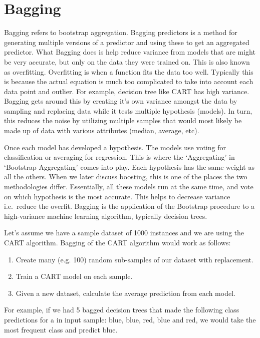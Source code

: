 \documentclass{book}
\begin{document}
\section{Bagging}
Bagging refers to bootstrap aggregation. Bagging predictors is a method for generating multiple versions of a predictor and using these to get an aggregated predictor.
What Bagging does is help reduce variance from models that are might be very accurate, but only on the data they were trained on. This is also known as overfitting. Overfitting is when a function fits the data too well. Typically this is because the actual equation is much too complicated to take into account each data point and outlier. For example, decision tree like CART has high variance.
Bagging gets around this by creating it's own variance amongst the data by sampling and replacing data while it tests multiple hypothesis (models). In turn, this reduces the noise by utilizing multiple samples that would most likely be made up of data with various attributes (median, average, etc).

Once each model has developed a hypothesis. The models use voting for classification or averaging for regression. This is where the `Aggregating' in `Bootstrap Aggregating' comes into play. Each hypothesis has the same weight as all the others. When we later discuss boosting, this is one of the places the two methodologies differ.
Essentially, all these models run at the same time, and vote on which hypothesis is the most accurate. This helps to decrease variance i.e.\ reduce the overfit.
Bagging is the application of the Bootstrap procedure to a high-variance machine learning algorithm, typically decision trees.

Let's assume we have a sample dataset of 1000 instances and we are using the CART algorithm. Bagging of the CART algorithm would work as follows:
\begin{enumerate} \addtolength{\itemsep}{-0.5\baselineskip}
\item Create many (e.g. 100) random sub-samples of our dataset with replacement.
\item Train a CART model on each sample.
\item Given a new dataset, calculate the average prediction from each model.
\end{enumerate}
For example, if we had 5 bagged decision trees that made the following class predictions for a in input sample: blue, blue, red, blue and red, we would take the most frequent class and predict blue.
\end{document}
